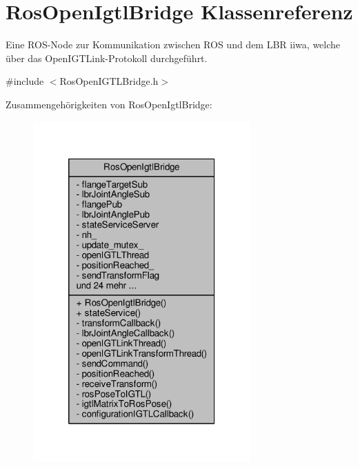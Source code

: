 \hypertarget{classRosOpenIgtlBridge}{\section{Ros\-Open\-Igtl\-Bridge Klassenreferenz}
\label{classRosOpenIgtlBridge}
}


Eine R\-O\-S-\/\-Node zur Kommunikation zwischen R\-O\-S und dem L\-B\-R iiwa, welche über das Open\-I\-G\-T\-Link-\/\-Protokoll durchgeführt.  




{\ttfamily \#include $<$Ros\-Open\-I\-G\-T\-L\-Bridge.\-h$>$}



Zusammengehörigkeiten von Ros\-Open\-Igtl\-Bridge\-:
\nopagebreak
\begin{figure}[H]
\begin{center}
\leavevmode
\includegraphics[width=236pt]{classRosOpenIgtlBridge__coll__graph}
\end{center}
\end{figure}
